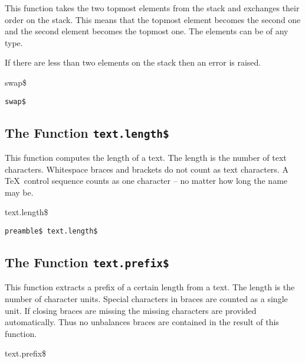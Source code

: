 This function takes the two topmost elements from the stack and
exchanges their order on the stack. This means that the topmost
element becomes the second one and the second element becomes the
topmost one. The elements can be of any type.

If there are less than two elements on the stack then an error is
raised.

\begin{BstFunction}{swap\$}
\end{BstFunction}

\begin{lstlisting}[language=bst]
  swap$
\end{lstlisting}%


\subsection{The Function \texttt{text.length\$}}%

This function computes the length of a text. The length is the number
of text characters. Whitespace braces and brackets do not count as
text characters. A \TeX\ control sequence counts as one character --
no matter how long the name may be.

\begin{BstFunction}{text.length\$}
\end{BstFunction}

\begin{lstlisting}[language=bst]
  preamble$ text.length$
\end{lstlisting}


\subsection{The Function \texttt{text.prefix\$}}%

This function extracts a prefix of a certain length from a text. The
length is the number of character units. Special characters in braces
are counted as a single unit. If closing braces are missing the
missing characters are provided automatically. Thus no unbalances
braces are contained in the result of this function.

\begin{BstFunction}{text.prefix\$}
\end{BstFunction}

